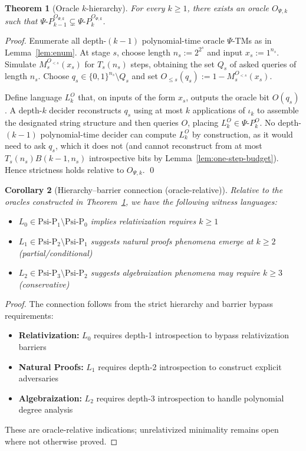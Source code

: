 \documentclass[11pt]{article}
\newtheorem{theorem}{Theorem}[section]
\newtheorem{corollary}[theorem]{Corollary}
\theoremstyle{definition}
\newcommand{\PSi}{\Psi}
\newcommand{\bits}{\{0,1\}}
\begin{document}
\begin{theorem}[Oracle $k$-hierarchy]
\label{thm:oracle-k-hierarchy}
For every $k\ge1$, there exists an oracle $O_{\PSi,k}$ such that $\Psi\text{-}P_{k-1}^{O_{\PSi,k}} \subsetneq \Psi\text{-}P_{k}^{O_{\PSi,k}}$.
\end{theorem}
\begin{proof}
Enumerate all depth-$(k{-}1)$ polynomial-time oracle $\PSi$-TMs as in Lemma~\ref{lem:enum}. At stage $s$, choose length $n_s:=2^{2^s}$ and input $x_s:=1^{n_s}$. Simulate $M_s^{O_{<s}}(x_s)$ for $T_s(n_s)$ steps, obtaining the set $Q_s$ of asked queries of length $n_s$. Choose $q_s\in\bits^{n_s}\setminus Q_s$ and set $O_{\le s}(q_s):=1-M_s^{O_{<s}}(x_s)$.

Define language $L_k^{O}$ that, on inputs of the form $x_s$, outputs the oracle bit $O(q_s)$. A depth-$k$ decider reconstructs $q_s$ using at most $k$ applications of $\iota_k$ to assemble the designated string structure and then queries $O$, placing $L_k^{O}\in\Psi\text{-}P_{k}^{O}$. No depth-$(k{-}1)$ polynomial-time decider can compute $L_k^{O}$ by construction, as it would need to ask $q_s$, which it does not (and cannot reconstruct from at most $T_s(n_s) B(k{-}1,n_s)$ introspective bits by Lemma~\ref{lem:one-step-budget}). Hence strictness holds relative to $O_{\PSi,k}$. \qed
\end{proof}

\begin{corollary}[Hierarchy--barrier connection (oracle-relative)]
Relative to the oracles constructed in Theorem~\ref{thm:oracle-k-hierarchy}, we have the following witness languages:
\begin{itemize}
    \item $L_0 \in \text{Psi-P}_1 \setminus \text{Psi-P}_0$ 
          implies relativization requires $k \geq 1$
    \item $L_1 \in \text{Psi-P}_2 \setminus \text{Psi-P}_1$ 
          suggests natural proofs phenomena emerge at $k \geq 2$ (partial/conditional)  
    \item $L_2 \in \text{Psi-P}_3 \setminus \text{Psi-P}_2$ 
          suggests algebraization phenomena may require $k \geq 3$ (conservative)
\end{itemize}
\end{corollary}

\begin{proof}
The connection follows from the strict hierarchy and barrier bypass requirements:
\begin{itemize}
    \item \textbf{Relativization:} $L_0$ requires depth-1 introspection to bypass relativization barriers
    \item \textbf{Natural Proofs:} $L_1$ requires depth-2 introspection to construct explicit adversaries
    \item \textbf{Algebraization:} $L_2$ requires depth-3 introspection to handle polynomial degree analysis
\end{itemize}
These are oracle-relative indications; unrelativized minimality remains open where not otherwise proved.
\end{proof}
\end{document}
